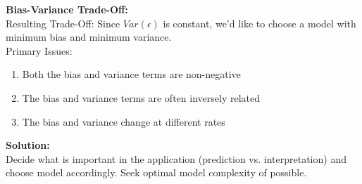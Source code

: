 \documentclass{article}
\begin{document}
\textbf{Bias-Variance Trade-Off:}\\
Resulting Trade-Off: Since $Var(\epsilon)$ is constant, we'd like to choose a model with minimum bias and minimum variance.\\
Primary Issues:
\begin{enumerate}
    \item Both the bias and variance terms are non-negative
    \item The bias and variance terms are often inversely related
    \item The bias and variance change at different rates
\end{enumerate}
\textbf{Solution:}\\
Decide what is important in the application (prediction vs. interpretation) and choose model accordingly. Seek optimal model complexity of possible.\\
\end{document}
